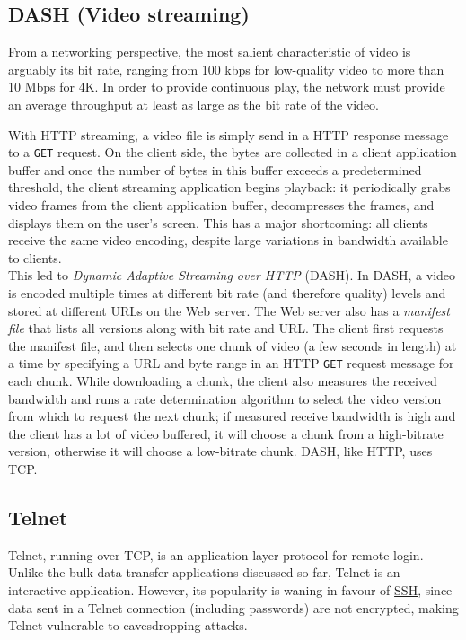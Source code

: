 \documentclass[8pt, table, xcdraw]{article}%
\begin{document}
\subsection{DASH (Video streaming)} \label{DASH}

From a networking perspective, the most salient characteristic of video is arguably its bit rate, ranging from 100 kbps for low-quality video to more than 10 Mbps for 4K. In order to provide continuous play, the network must provide an average throughput at least as large as the bit
rate of the video.

With HTTP streaming, a video file is simply send in a HTTP response message to a \texttt{GET} request. On the client side, the bytes are collected in a client application buffer and once the number of bytes in this buffer exceeds a predetermined threshold, the client streaming application begins playback: it periodically grabs video frames from the client application buffer, decompresses the frames, and displays them on the user’s screen. This has a major shortcoming: all clients receive the same video encoding, despite large variations in bandwidth available to clients.\\
This led to \emph{Dynamic Adaptive Streaming over HTTP} (DASH). In DASH, a video is encoded multiple times at different bit rate (and therefore quality) levels and stored at different URLs on the Web server. The Web server also has a \emph{manifest file} that lists all versions along with bit rate and URL. The client first requests the manifest file, and then selects one chunk of video (a few seconds in length) at a time by specifying a URL and byte range in an HTTP \texttt{GET} request message for each chunk. While downloading a chunk, the client also measures the received bandwidth and runs a rate determination algorithm to select the video version from which to request the next chunk; if measured receive bandwidth is high and the client has a lot of video buffered, it will choose a chunk from a high-bitrate version, otherwise it will choose a low-bitrate chunk. DASH, like HTTP, uses TCP.

\subsection{Telnet} \label{telnet}

Telnet, running over TCP, is an application-layer protocol for remote login. Unlike the bulk data transfer applications discussed so far, Telnet is an interactive application. However, its popularity is waning in favour of \hyperref[ssh]{SSH}, since data sent in a Telnet connection (including passwords) are not encrypted, making Telnet vulnerable to eavesdropping attacks.
\end{document}
